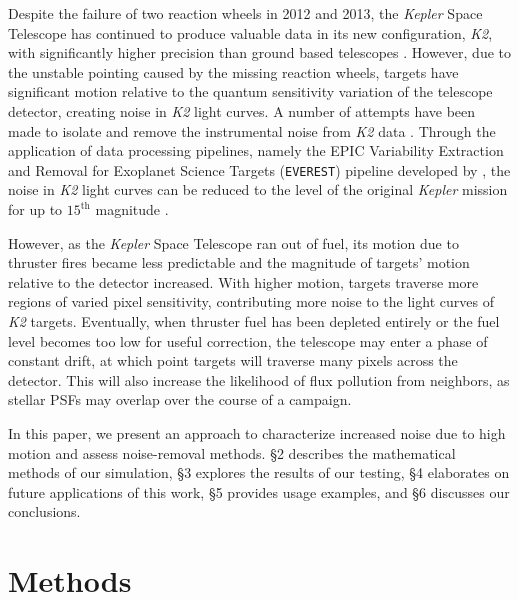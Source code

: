 \documentclass[12pt,preprint]{aastex}
\begin{document}
Despite the failure of two reaction wheels in 2012 and 2013, the \textit{Kepler} Space Telescope has continued to produce valuable data in its new configuration, \textit{K2}, with significantly higher precision than ground based telescopes \citep{2014PASP..126..398H}. However, due to the unstable pointing caused by the missing reaction wheels, targets have significant motion relative to the quantum sensitivity variation of the telescope detector, creating noise in \textit{K2} light curves. A number of attempts have been made to isolate and remove the instrumental noise from \textit{K2} data \citep{2014PASP..126..948V,2015A&A...579A..19A, 0004-637X-806-1-30, 2015MNRAS.454.4159H, 2015MNRAS.447.2880A, 2016MNRAS.459.2408A}. Through the application of data processing pipelines, namely the EPIC Variability Extraction and Removal for Exoplanet Science Targets (\texttt{EVEREST}) pipeline developed by \cite{2016AJ....152..100L}, the noise in \textit{K2} light curves can be reduced to the level of the original \textit{Kepler} mission for up to $15^{\text{th}}$ magnitude \citep{2018AJ....156...99L}.

However, as the \textit{Kepler} Space Telescope ran out of fuel, its motion due to thruster fires became less predictable and the magnitude of targets' motion relative to the detector increased. With higher motion, targets traverse more regions of varied pixel sensitivity, contributing more noise to the light curves of \textit{K2} targets. Eventually, when thruster fuel has been depleted entirely or the fuel level becomes too low for useful correction, the telescope may enter a phase of constant drift, at which point targets will traverse many pixels across the detector. This will also increase the likelihood of flux pollution from neighbors, as stellar PSFs may overlap over the course of a campaign.

In this paper, we present an approach to characterize increased noise due to high motion and assess noise-removal methods. \S 2 describes the mathematical methods of our simulation, \S 3 explores the results of our testing, \S 4 elaborates on future applications of this work, \S 5 provides usage examples, and \S 6 discusses our conclusions.

\section{Methods}
\end{document}
